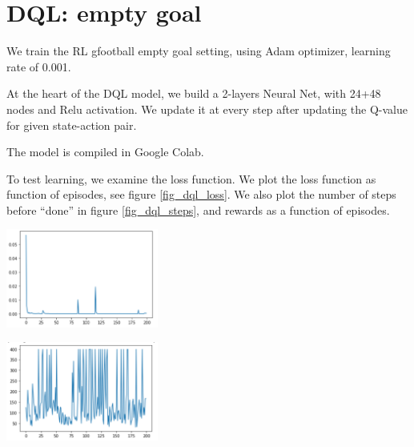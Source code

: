\section{DQL: empty goal}\label{DQL}

We train the RL gfootball empty goal setting, using Adam optimizer, learning rate of 0.001.

At the heart of the DQL model, we build a 2-layers Neural Net, with 24+48 nodes and Relu activation. We update it at every step after updating the Q-value for given state-action pair.

The model is compiled in Google Colab.

To test learning, we examine the loss function. We plot the loss function as function of episodes, see figure \ref{fig_dql_loss}. We also plot the number of steps before ``done'' in figure \ref{fig_dql_steps}, and rewards as a function of episodes.


\begin{center}
\includegraphics[width=5cm]{fig_dql_loss.jpg}
\label{fig_dql_loss}
\end{center}


\begin{center}
\includegraphics[width=5cm]{fig_dql_steps.jpg}
\label{fig_dql_steps}
\end{center}